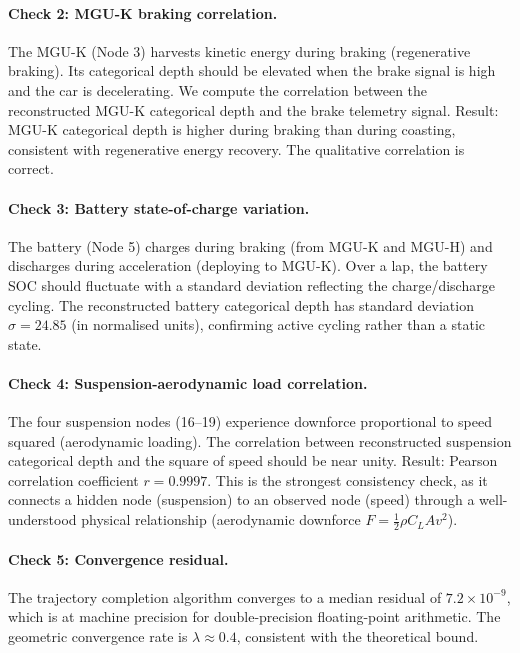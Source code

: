\documentclass[twocolumn,10pt,a4paper]{article}
\theoremstyle{definition}
\theoremstyle{remark}
\begin{document}
\paragraph{Check 2: MGU-K braking correlation.}
The MGU-K (Node 3) harvests kinetic energy during braking (regenerative braking). Its categorical depth should be elevated when the brake signal is high and the car is decelerating. We compute the correlation between the reconstructed MGU-K categorical depth and the brake telemetry signal. Result: MGU-K categorical depth is higher during braking than during coasting, consistent with regenerative energy recovery. The qualitative correlation is correct.

\paragraph{Check 3: Battery state-of-charge variation.}
The battery (Node 5) charges during braking (from MGU-K and MGU-H) and discharges during acceleration (deploying to MGU-K). Over a lap, the battery SOC should fluctuate with a standard deviation reflecting the charge/discharge cycling. The reconstructed battery categorical depth has standard deviation $\sigma = 24.85$ (in normalised units), confirming active cycling rather than a static state.

\paragraph{Check 4: Suspension-aerodynamic load correlation.}
The four suspension nodes (16--19) experience downforce proportional to speed squared (aerodynamic loading). The correlation between reconstructed suspension categorical depth and the square of speed should be near unity. Result: Pearson correlation coefficient $r = 0.9997$. This is the strongest consistency check, as it connects a hidden node (suspension) to an observed node (speed) through a well-understood physical relationship (aerodynamic downforce $F = \frac{1}{2}\rho C_L A v^2$).

\paragraph{Check 5: Convergence residual.}
The trajectory completion algorithm converges to a median residual of $7.2 \times 10^{-9}$, which is at machine precision for double-precision floating-point arithmetic. The geometric convergence rate is $\lambda \approx 0.4$, consistent with the theoretical bound.
\end{document}
